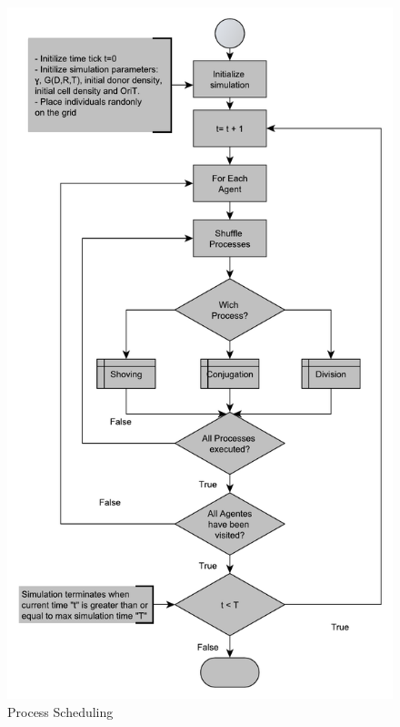 \begin{figure}
\centering
\includegraphics[scale=0.7]{m2-overview.pdf}
\caption[Process Scheduling]{\label{fig:proc-sched} Process Scheduling}
\end{figure}


